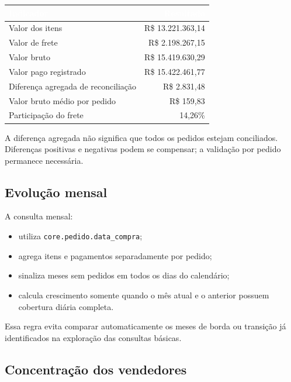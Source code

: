 \documentclass[12pt,a4paper]{article}
\newcounter{none}
\newcommand{\CabecalhoTabela}[1]{\textcolor{white}{\textbf{#1}}}
\providecommand{\tightlist}{
  \setlength{\itemsep}{0pt}\setlength{\parskip}{0pt}
}
\begin{document}
{\def\LTcaptype{none} %
\begin{longtable}[]{@{}lr@{}}
\toprule\noalign{}
\rowcolor{AzulCorporativo}
\CabecalhoTabela{Indicador} & \CabecalhoTabela{Resultado} \\
\midrule\noalign{}
\endhead
\bottomrule\noalign{}
\endlastfoot
Valor dos itens & R\$ 13.221.363,14 \\
Valor de frete & R\$ 2.198.267,15 \\
Valor bruto & R\$ 15.419.630,29 \\
Valor pago registrado & R\$ 15.422.461,77 \\
Diferença agregada de reconciliação & R\$ 2.831,48 \\
Valor bruto médio por pedido & R\$ 159,83 \\
Participação do frete & 14,26\% \\
\end{longtable}
}

A diferença agregada não significa que todos os pedidos estejam
conciliados. Diferenças positivas e negativas podem se compensar; a
validação por pedido permanece necessária.

\subsection{Evolução
mensal}\label{docs__analytics__evidencias_consultas_analiticas_core.md__evoluuxe7uxe3o-mensal}

A consulta mensal:

\begin{itemize}
\tightlist
\item
  utiliza \nolinkurl{core.pedido.data_compra};
\item
  agrega itens e pagamentos separadamente por pedido;
\item
  sinaliza meses sem pedidos em todos os dias do calendário;
\item
  calcula crescimento somente quando o mês atual e o anterior possuem
  cobertura diária completa.
\end{itemize}

Essa regra evita comparar automaticamente os meses de borda ou transição
já identificados na exploração das consultas básicas.

\subsection{Concentração dos
vendedores}\label{docs__analytics__evidencias_consultas_analiticas_core.md__concentrauxe7uxe3o-dos-vendedores}
\end{document}
